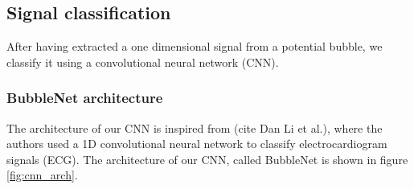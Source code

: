 		
		\subsection{Signal classification}
		After having extracted a one dimensional signal from a potential bubble, we classify it using a convolutional neural network (CNN). 

		\subsubsection{BubbleNet architecture}		
		The architecture of our CNN is inspired from (cite Dan Li et al.), where the authors used a 1D convolutional neural network to classify electrocardiogram signals (ECG). The architecture of our CNN, called BubbleNet is shown in figure \ref{fig:cnn_arch}. 
		
